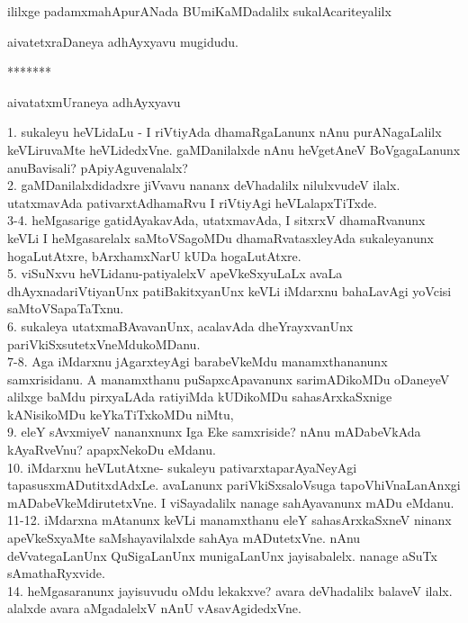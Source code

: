 \documentclass{article}
\begin{document}
\begin{center}
ililxge padamxmahApurANada BUmiKaMDadalilx sukalAcariteyalilx
\end{center}

\begin{center}
aivatetxraDaneya adhAyxyavu mugidudu.
\end{center}

\begin{center}
*******
\end{center}

\begin{center}
aivatatxmUraneya adhAyxyavu
\end{center}

1. sukaleyu heVLidaLu - I riVtiyAda dhamaRgaLanunx nAnu purANagaLalilx keVLiruvaMte heVLidedxVne. gaMDanilalxde nAnu heVgetAneV BoVgagaLanunx anuBavisali? pApiyAguvenalalx?\\
2. gaMDanilalxdidadxre jiVvavu nananx deVhadalilx nilulxvudeV ilalx. utatxmavAda pativarxtAdhamaRvu I riVtiyAgi heVLalapxTiTxde.\\
3-4. heMgasarige gatidAyakavAda, utatxmavAda, I sitxrxV dhamaRvanunx keVLi I heMgasarelalx saMtoVSagoMDu dhamaRvatasxleyAda sukaleyanunx hogaLutAtxre, bArxhamxNarU kUDa hogaLutAtxre.\\
5. viSuNxvu heVLidanu-patiyalelxV apeVkeSxyuLaLx avaLa dhAyxnadariVtiyanUnx patiBakitxyanUnx keVLi iMdarxnu bahaLavAgi yoVcisi saMtoVSapaTaTxnu.\\
6. sukaleya utatxmaBAvavanUnx, acalavAda dheYrayxvanUnx pariVkiSxsutetxVneMdukoMDanu.\\
7-8. Aga iMdarxnu jAgarxteyAgi barabeVkeMdu manamxthananunx samxrisidanu. A manamxthanu puSapxcApavanunx sarimADikoMDu oDaneyeV alilxge baMdu pirxyaLAda ratiyiMda kUDikoMDu sahasArxkaSxnige kANisikoMDu keYkaTiTxkoMDu niMtu,\\
9. eleY sAvxmiyeV nananxnunx Iga Eke samxriside? nAnu mADabeVkAda kAyaRveVnu? apapxNekoDu eMdanu.\\
10. iMdarxnu heVLutAtxne- sukaleyu pativarxtaparAyaNeyAgi tapasusxmADutitxdAdxLe. avaLanunx pariVkiSxsaloVsuga tapoVhiVnaLanAnxgi mADabeVkeMdirutetxVne. I viSayadalilx nanage sahAyavanunx mADu eMdanu.\\
11-12. iMdarxna mAtanunx keVLi manamxthanu eleY sahasArxkaSxneV ninanx apeVkeSxyaMte saMshayavilalxde sahAya mADutetxVne. nAnu deVvategaLanUnx QuSigaLanUnx munigaLanUnx jayisabalelx. nanage aSuTx sAmathaRyxvide.\\
14. heMgasaranunx jayisuvudu oMdu lekakxve? avara deVhadalilx balaveV ilalx. alalxde avara aMgadalelxV nAnU vAsavAgidedxVne.\\
\end{document}

